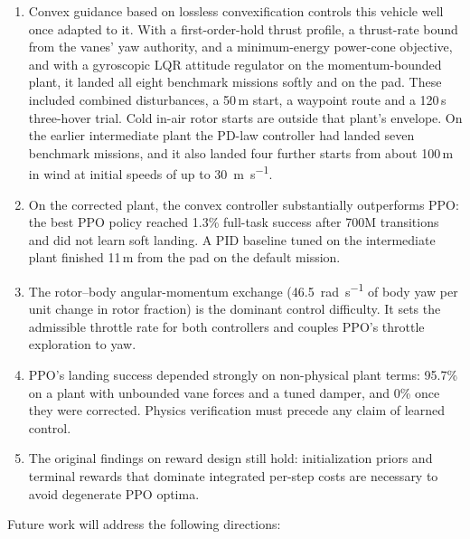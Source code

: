 \documentclass[conference]{IEEEtran}
\begin{document}
\begin{enumerate}
    \item Convex guidance based on lossless convexification \cite{b21} controls this vehicle well once adapted to it. With a first-order-hold thrust profile, a thrust-rate bound from the vanes' yaw authority, and a minimum-energy power-cone objective, and with a gyroscopic LQR attitude regulator on the momentum-bounded plant, it landed all eight benchmark missions softly and on the pad. These included combined disturbances, a 50\,m start, a waypoint route and a 120\,s three-hover trial. Cold in-air rotor starts are outside that plant's envelope. On the earlier intermediate plant the PD-law controller had landed seven benchmark missions, and it also landed four further starts from about 100\,m in wind at initial speeds of up to \SI{30}{\metre\per\second}.
    \item On the corrected plant, the convex controller substantially outperforms PPO: the best PPO policy reached 1.3\% full-task success after 700M transitions and did not learn soft landing. A PID baseline tuned on the intermediate plant finished 11\,m from the pad on the default mission.
    \item The rotor--body angular-momentum exchange (\SI{46.5}{\radian\per\second} of body yaw per unit change in rotor fraction) is the dominant control difficulty. It sets the admissible throttle rate for both controllers and couples PPO's throttle exploration to yaw.
    \item PPO's landing success depended strongly on non-physical plant terms: 95.7\% on a plant with unbounded vane forces and a tuned damper, and 0\% once they were corrected. Physics verification must precede any claim of learned control.
    \item The original findings on reward design still hold: initialization priors and terminal rewards that dominate integrated per-step costs are necessary to avoid degenerate PPO optima.
\end{enumerate}

Future work will address the following directions:
\end{document}
